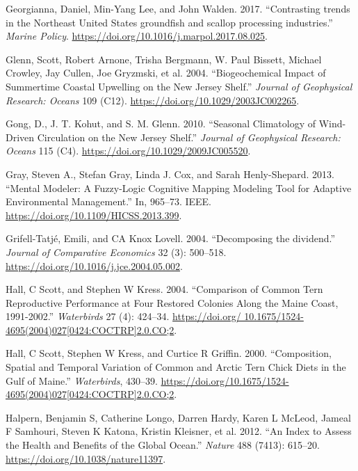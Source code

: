 \documentclass[
]{book}
\begin{document}
\leavevmode\hypertarget{ref-Georgianna2017}{}%
Georgianna, Daniel, Min-Yang Lee, and John Walden. 2017. ``Contrasting trends in the Northeast United States groundfish and scallop processing industries.'' \emph{Marine Policy}. \url{https://doi.org/10.1016/j.marpol.2017.08.025}.

\leavevmode\hypertarget{ref-glenn_biogeochemical_2004}{}%
Glenn, Scott, Robert Arnone, Trisha Bergmann, W. Paul Bissett, Michael Crowley, Jay Cullen, Joe Gryzmski, et al. 2004. ``Biogeochemical Impact of Summertime Coastal Upwelling on the New Jersey Shelf.'' \emph{Journal of Geophysical Research: Oceans} 109 (C12). \url{https://doi.org/10.1029/2003JC002265}.

\leavevmode\hypertarget{ref-gong_seasonal_2010}{}%
Gong, D., J. T. Kohut, and S. M. Glenn. 2010. ``Seasonal Climatology of Wind-Driven Circulation on the New Jersey Shelf.'' \emph{Journal of Geophysical Research: Oceans} 115 (C4). \url{https://doi.org/10.1029/2009JC005520}.

\leavevmode\hypertarget{ref-gray_mental_2013}{}%
Gray, Steven A., Stefan Gray, Linda J. Cox, and Sarah Henly-Shepard. 2013. ``Mental Modeler: A Fuzzy-Logic Cognitive Mapping Modeling Tool for Adaptive Environmental Management.'' In, 965--73. IEEE. \url{https://doi.org/10.1109/HICSS.2013.399}.

\leavevmode\hypertarget{ref-Grifell-Tatje2004}{}%
Grifell-Tatjé, Emili, and CA Knox Lovell. 2004. ``Decomposing the dividend.'' \emph{Journal of Comparative Economics} 32 (3): 500--518. \url{https://doi.org/10.1016/j.jce.2004.05.002}.

\leavevmode\hypertarget{ref-hall2004}{}%
Hall, C Scott, and Stephen W Kress. 2004. ``Comparison of Common Tern Reproductive Performance at Four Restored Colonies Along the Maine Coast, 1991-2002.'' \emph{Waterbirds} 27 (4): 424--34. \href{https://doi.org/\%2010.1675/1524-4695(2004)027\%5B0424:COCTRP\%5D2.0.CO;2}{https://doi.org/ 10.1675/1524-4695(2004)027{[}0424:COCTRP{]}2.0.CO;2}.

\leavevmode\hypertarget{ref-hall2000}{}%
Hall, C Scott, Stephen W Kress, and Curtice R Griffin. 2000. ``Composition, Spatial and Temporal Variation of Common and Arctic Tern Chick Diets in the Gulf of Maine.'' \emph{Waterbirds}, 430--39. \href{https://doi.org/10.1675/1524-4695(2004)027\%5B0424:COCTRP\%5D2.0.CO;2}{https://doi.org/10.1675/1524-4695(2004)027{[}0424:COCTRP{]}2.0.CO;2}.

\leavevmode\hypertarget{ref-halpern_index_2012}{}%
Halpern, Benjamin S, Catherine Longo, Darren Hardy, Karen L McLeod, Jameal F Samhouri, Steven K Katona, Kristin Kleisner, et al. 2012. ``An Index to Assess the Health and Benefits of the Global Ocean.'' \emph{Nature} 488 (7413): 615--20. \url{https://doi.org/10.1038/nature11397}.
\end{document}
